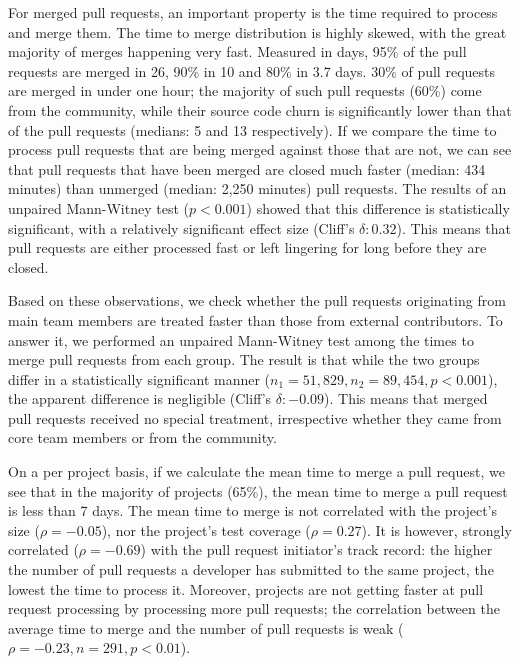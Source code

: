 \documentclass{sig-alternate}
\begin{document}
For merged pull requests, an important property is the time required to process
and merge them. The time to merge distribution is highly skewed, with the great
majority of merges happening very fast. Measured in days, 95\% of the pull
requests are merged in 26, 90\% in 10 and 80\% in 3.7 days. 
30\% of pull requests are merged in under one hour; the majority of such pull requests (60\%)
come from the community, while their source code churn is significantly lower
than that of the pull requests (medians: 5 and 13 respectively). If we compare
the time to process pull requests that are being merged against those that are
not, we can see that pull requests that have been merged are closed much faster
(median: 434 minutes) than unmerged (median: 2,250 minutes) pull requests.  The
results of an unpaired Mann-Witney test ($p < 0.001$) showed that this
difference is statistically significant, with a relatively significant effect
size (Cliff's $\delta: 0.32$). This means that pull requests are either
processed fast or left lingering for long before they are closed.

Based on these observations, we check whether the pull
requests originating from main team members are treated faster than those from
external contributors. To answer it, we performed an unpaired Mann-Witney test
among the times to merge pull requests from each group. The result is that while
the two groups differ in a statistically significant manner ($n_1 = 51,829, n_2
= 89,454, p < 0.001$), the apparent difference is negligible (Cliff's $\delta:
-0.09$). This means that merged pull requests received no special treatment,
irrespective whether they came from core team members or from the community.

On a per project basis, if we calculate the mean time to merge a pull request,
we see that in the majority of projects (65\%), the mean time to merge a pull
request is less than 7 days. The mean time to merge is not correlated with the
project's size ($\rho = -0.05$), nor the project's test coverage ($\rho =
0.27$). It is however, strongly correlated ($\rho = -0.69$) with the pull
request initiator's track record: the higher the number of pull requests a
developer has submitted to the same project, the lowest the time to process it.
Moreover, projects are not getting faster at pull request processing by
processing more pull requests; the correlation between the average time to merge
and the number of pull requests is weak ($\rho = -0.23, n = 291, p < 0.01$).
\end{document}
